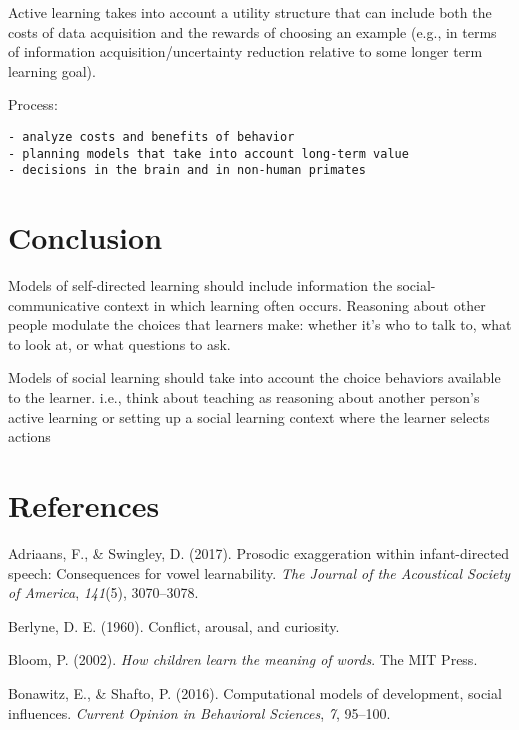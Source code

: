 \documentclass[a4paper,man,apacite,floatsintext]{apa6}
\begin{document}
Active learning takes into account a utility structure that can include
both the costs of data acquisition and the rewards of choosing an
example (e.g., in terms of information acquisition/uncertainty reduction
relative to some longer term learning goal).

Process:

\begin{verbatim}
- analyze costs and benefits of behavior
- planning models that take into account long-term value
- decisions in the brain and in non-human primates 
\end{verbatim}

\section{Conclusion}\label{conclusion}

Models of self-directed learning should include information the
social-communicative context in which learning often occurs. Reasoning
about other people modulate the choices that learners make: whether it's
who to talk to, what to look at, or what questions to ask.

Models of social learning should take into account the choice behaviors
available to the learner. i.e., think about teaching as reasoning about
another person's active learning or setting up a social learning context
where the learner selects actions

\newpage

\section{References}\label{references}

\setlength{\parindent}{-0.4in} \setlength{\leftskip}{0.125in} \noindent

\hypertarget{refs}{}
\hypertarget{ref-adriaans2017prosodic}{}
Adriaans, F., \& Swingley, D. (2017). Prosodic exaggeration within
infant-directed speech: Consequences for vowel learnability. \emph{The
Journal of the Acoustical Society of America}, \emph{141}(5),
3070--3078.

\hypertarget{ref-berlyne1960conflict}{}
Berlyne, D. E. (1960). Conflict, arousal, and curiosity.

\hypertarget{ref-bloom2002children}{}
Bloom, P. (2002). \emph{How children learn the meaning of words}. The
MIT Press.

\hypertarget{ref-bonawitz2016computational}{}
Bonawitz, E., \& Shafto, P. (2016). Computational models of development,
social influences. \emph{Current Opinion in Behavioral Sciences},
\emph{7}, 95--100.
\end{document}
